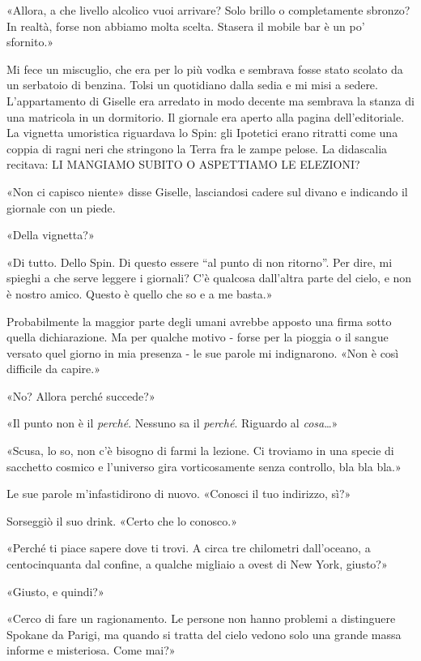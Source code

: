 «Allora, a che livello alcolico vuoi arrivare? Solo brillo o
completamente sbronzo? In realtà, forse non abbiamo molta scelta.
Stasera il mobile bar è un po' sfornito.»

Mi fece un miscuglio, che era per lo più vodka e sembrava fosse stato
scolato da un serbatoio di benzina. Tolsi un quotidiano dalla sedia e mi
misi a sedere. L'appartamento di Giselle era arredato in modo decente ma
sembrava la stanza di una matricola in un dormitorio. Il giornale era
aperto alla pagina dell'editoriale. La vignetta umoristica riguardava lo
Spin: gli Ipotetici erano ritratti come una coppia di ragni neri che
stringono la Terra fra le zampe pelose. La didascalia recitava: {LI
	MANGIAMO SUBITO O ASPETTIAMO LE ELEZIONI}?

«Non ci capisco niente» disse Giselle, lasciandosi cadere sul divano e
indicando il giornale con un piede.

«Della vignetta?»

«Di tutto. Dello Spin. Di questo essere ``al punto di non ritorno''. Per
dire, mi spieghi a che serve leggere i giornali? C'è qualcosa dall'altra
parte del cielo, e non è nostro amico. Questo è quello che so e a me
basta.»

Probabilmente la maggior parte degli umani avrebbe apposto una firma
sotto quella dichiarazione. Ma per qualche motivo - forse per la pioggia
o il sangue versato quel giorno in mia presenza - le sue parole mi
indignarono. «Non è così difficile da capire.»

«No? Allora perché succede?»

«Il punto non è il \emph{perché}. Nessuno sa il \emph{perché}. Riguardo
al \emph{cosa}\ldots»

«Scusa, lo so, non c'è bisogno di farmi la lezione. Ci troviamo in una
specie di sacchetto cosmico e l'universo gira vorticosamente senza
controllo, bla bla bla.»

Le sue parole m'infastidirono di nuovo. «Conosci il tuo indirizzo, sì?»

Sorseggiò il suo drink. «Certo che lo conosco.»

«Perché ti piace sapere dove ti trovi. A circa tre chilometri
dall'oceano, a centocinquanta dal confine, a qualche migliaio a ovest di
New York, giusto?»

«Giusto, e quindi?»

«Cerco di fare un ragionamento. Le persone non hanno problemi a
distinguere Spokane da Parigi, ma quando si tratta del cielo vedono solo
una grande massa informe e misteriosa. Come mai?»

